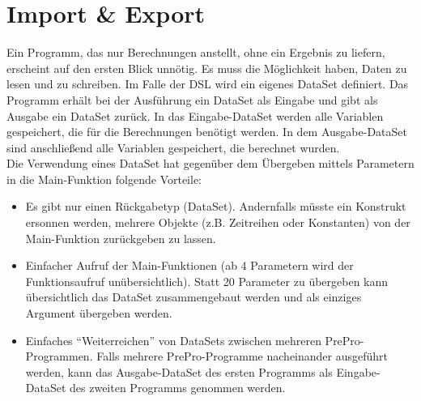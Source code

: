 \section{Import \& Export}
\label{sec:Import}

Ein Programm, das nur Berechnungen anstellt, ohne ein Ergebnis zu liefern, erscheint auf den ersten Blick unnötig.
Es muss die Möglichkeit haben, Daten zu lesen und zu schreiben.
Im Falle der DSL wird ein eigenes DataSet definiert.
Das Programm erhält bei der Ausführung ein DataSet als Eingabe und gibt als Ausgabe ein DataSet zurück.
In das Eingabe-DataSet werden alle Variablen gespeichert, die für die Berechnungen benötigt werden.
In dem Ausgabe-DataSet sind anschließend alle Variablen gespeichert, die berechnet wurden.\\
Die Verwendung eines DataSet hat gegenüber dem Übergeben mittels Parametern in die Main-Funktion folgende Vorteile:
\begin{itemize}
\item Es gibt nur einen Rückgabetyp (DataSet).
Andernfalls müsste ein Konstrukt ersonnen werden, mehrere Objekte (z.B. Zeitreihen oder Konstanten) von der Main-Funktion zurückgeben zu lassen.
\item Einfacher Aufruf der Main-Funktionen (ab 4 Parametern wird der Funktionsaufruf unübersichtlich\cite{parameterCount}). Statt 20 Parameter zu übergeben kann übersichtlich das DataSet zusammengebaut werden und als einziges Argument übergeben werden.
\item Einfaches ``Weiterreichen'' von DataSets zwischen mehreren PrePro-Programmen.
Falls mehrere PrePro-Programme nacheinander ausgeführt werden, kann das Ausgabe-DataSet des ersten Programms als Eingabe-DataSet des zweiten Programms genommen werden.
\end{itemize}

